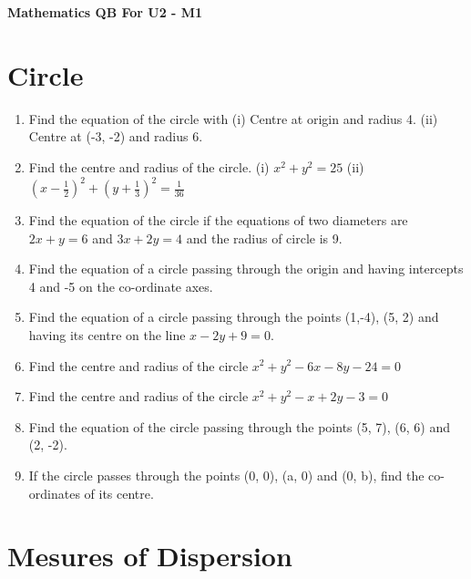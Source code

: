 \documentclass[14pt]{article}
\begin{document}
\centering 
{\huge \bf Mathematics QB For U2 - M1\par}
\vspace{1cm}
\begin{multicols}{2}

\section{Circle}
\noindent
\begin{enumerate}[resume]
 \item Find the equation of the circle with
(i) Centre at origin and radius 4.
(ii) Centre at (-3, -2) and radius 6.
\item Find the centre and radius of the circle.
(i) $x^2 + y^2 = 25$ (ii) $\left(x -\frac{1}{2}\right)^2 + \left(y +\frac{1}{3}\right)^2 = \frac{1}{36}$
\item Find the equation of the circle if the equations of two diameters are $2x + y = 6$ and $3x + 2y = 4$ and the radius of circle is 9.
\item Find the equation of a circle passing through the origin and having intercepts 4 and -5 on
the co-ordinate axes.

\item Find the equation of a circle passing through the points (1,-4), (5, 2) and having its centre on the line $x-2y+9 =0$.

\item Find the centre and radius of the circle $x^2 + y^2 - 6x - 8y - 24 = 0$ 

\item Find the centre and radius of the circle $x^2 + y^2 - x +2y - 3 = 0$ 

\item Find the equation of the circle passing through the points (5, 7), (6, 6) and (2, -2).

\item If the circle passes through the points (0, 0), (a, 0) and (0, b), find the co-ordinates of its centre.

\end{enumerate} 


\section{Mesures of Dispersion}
\noindent
\begin{enumerate}[resume]



\end{enumerate}
\end{multicols}
\end{document}
